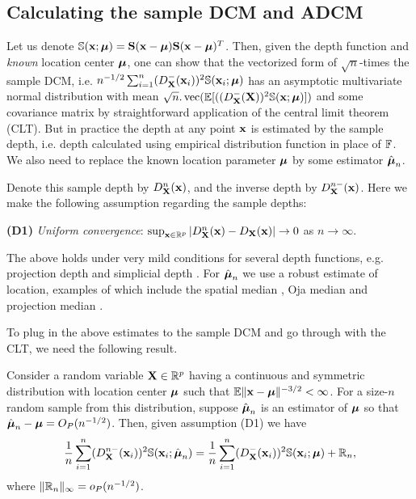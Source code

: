 \subsection{Calculating the sample DCM and ADCM}
\label{subsec:sample-DCM}
Let us denote ${\mathbb{S}}({\bf{x}}; {\boldsymbol{\mu}}) = {\mathbf{S}}({\bf{x}} - {\boldsymbol{\mu}}) {\mathbf{S}}({\bf{x}} - {\boldsymbol{\mu}})^T$. Then, given the depth function and {\it known} location center ${\boldsymbol{\mu}}$, one can show that the vectorized form of $\sqrt n$-times the sample DCM, i.e. $n^{-1/2} \sum_{i=1}^n (D^-_{\mathbf{X}}({\bf{x}}_i))^2 {\mathbb{S}} ({\bf{x}}_i; {\boldsymbol{\mu}})$  has an asymptotic multivariate normal distribution with mean $\sqrt n. \operatorname*{vec}( {\mathbb{E}} [( (D^-_{\mathbf{X}} ({\mathbf{X}}))^2 {\mathbb{S}}({\bf{x}}; {\boldsymbol{\mu}})])$ and some covariance matrix by straightforward application of the central limit theorem (CLT). But in practice the depth at any point ${\bf{x}}$ is estimated by the sample depth, i.e. depth calculated using empirical distribution function in place of ${\mathbb{F}}$. We also need to replace the known location parameter ${\boldsymbol{\mu}}$ by some estimator $\hat{{\boldsymbol{\mu}}}_n$.

Denote this sample depth by $D^n_{\mathbf{X}} ({\bf{x}})$, and the inverse depth by $D^{n-}_{\mathbf{X}} ({\bf{x}})$. Here we make the following assumption regarding the sample depths:

\vspace{1em}
\noindent\textbf{(D1)} \textit{Uniform convergence}: $\sup_{{\bf{x}} \in \mathbb R^p} | D^n_{\mathbf{X}} ({\bf{x}}) - D_{\mathbf{X}} ({\bf{x}}) | \rightarrow 0$ as $n \rightarrow \infty $.
\vspace{1em}

\noindent The above holds under very mild conditions for several depth functions, e.g. projection depth \citep{zuo03} and simplicial depth \citep{Dumbgen92}. For $\hat {{\boldsymbol{\mu}}}_n$ we use a robust estimate of location, examples of which include the spatial median \citep{haldane48,brown83}, Oja median \citep{oja83} and projection median \citep{zuo03}.

To plug in the above estimates to the sample DCM and go through with the CLT, we need the following result.

\begin{Lemma} \label{Lemma:lemma1}
Consider a random variable ${\mathbf{X}} \in \mathbb{R}^p$ having a continuous and symmetric distribution with location center ${\boldsymbol{\mu}}$ such that ${\mathbb{E}} \|{\bf{x}} - {\boldsymbol{\mu}} \|^{-3/2} < \infty$. For a size-$n$ random sample from this distribution, suppose $\hat{{\boldsymbol{\mu}}}_n$ is an estimator of ${\boldsymbol{\mu}}$ so that $\hat{{\boldsymbol{\mu}}}_n - {\boldsymbol{\mu}} = O_P(n^{-1/2}) $. Then, given assumption (D1) we have
%
$$
\frac{1}{n} \sum_{i=1}^n (D^{n-}_{\mathbf{X}} ({\bf{x}}_i))^2 {\mathbb{S}}({\bf{x}}_i; \hat{{\boldsymbol{\mu}}}_n) = \frac{1}{n} \sum_{i=1}^n (D^-_{\mathbf{X}} ({\bf{x}}_i))^2 {\mathbb{S}}({\bf{x}}_i; {\boldsymbol{\mu}})
+ {\mathbb{R}}_n,
$$
%
where $\| {\mathbb{R}}_n \|_\infty = o_P(n^{-1/2})$.
\end{Lemma}

